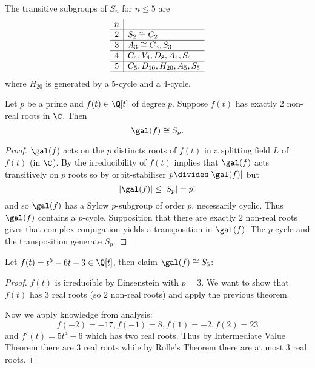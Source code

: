 \documentclass[a4paper]{article}
\begin{document}
\begin{lemma}
  The transitive subgroups of \(S_n\) for \(n \leq 5\) are
  \[
  \begin{array}[h]{c|l}
    n & \\ \hline
    2 & S_2 \cong C_2 \\ \hline
    3 & A_3 \cong C_3, S_3 \\ \hline
    4 & C_4, V_4, D_8, A_4, S_4 \\ \hline
    5 & C_5, D_{10}, H_{20}, A_5, S_5 \\ \hline
  \end{array}
  \]
  where \(H_{20}\) is generated by a \(5\)-cycle and a \(4\)-cycle.
\end{lemma}

\begin{theorem}
  Let \(p\) be a prime and \(f(t) \in \Q[t]\) of degree \(p\). Suppose \(f(t)\) has exactly \(2\) non-real roots in \(\C\). Then
  \[
    \gal(f) \cong S_p.
  \]
\end{theorem}

\begin{proof}
  \(\gal(f)\) acts on the \(p\) distincts roots of \(f(t)\) in a splitting field \(L\) of \(f(t)\) (in \(\C\)). By  the irreducibility of \(f(t)\) implies that \(\gal(f)\) acts transitively on \(p\) roots so by orbit-stabiliser \(p \divides |\gal(f)|\) but
  \[
    |\gal(f)| \leq |S_p| = p!
  \]
  and so \(\gal(f)\) has a Sylow \(p\)-subgroup of order \(p\), necessarily cyclic. Thus \(\gal(f)\) contains a \(p\)-cycle. Supposition that there are exactly \(2\) non-real roots gives that complex conjugation yields a transposition in \(\gal(f)\). The \(p\)-cycle and the transposition generate \(S_p\).
\end{proof}

\begin{eg}
  Let \(f(t) = t^5 - 6t + 3 \in \Q[t]\), then claim \(\gal(f) \cong S_5\):

  \begin{proof}
    \(f(t)\) is irreducible by Einsenstein with \(p = 3\). We want to show that \(f(t)\) has \(3\) real roots (so \(2\) non-real roots) and apply the previous theorem.

    Now we apply knowledge from analysis:
    \[
      f(-2) = -17, f(-1) = 8, f(1) = -2, f(2) = 23
    \]
    and \(f'(t) = 5t^4 - 6\) which has two real roots. Thus by Intermediate Value Theorem there are \(3\) real roots while by Rolle's Theorem there are at most \(3\) real roots.
  \end{proof}
\end{eg}
\end{document}

